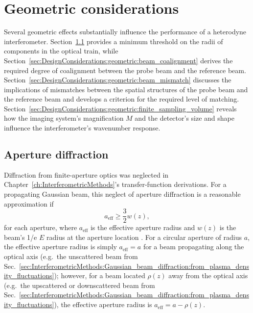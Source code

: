 \section{Geometric considerations}
\label{sec:DesignConsiderations:geometric}
Several geometric effects substantially influence
the performance of a heterodyne interferometer.
Section~\ref{sec:DesignConsiderations:geometric:aperture_diffraction}
provides a minimum threshold on the radii of components in the optical train,
while Section~\ref{sec:DesignConsiderations:geometric:beam_coalignment}
derives the required degree of coalignment between
the probe beam and the reference beam.
Section~\ref{sec:DesignConsiderations:geometric:beam_mismatch}
discusses the implications of mismatches between
the spatial structures of the probe beam and the reference beam and
develops a criterion for the required level of matching.
Section~\ref{sec:DesignConsiderations:geometric:finite_sampling_volume}
reveals how the imaging system's magnification $M$ and
the detector's size and shape
influence the interferometer's wavenumber response.


\subsection{Aperture diffraction}
\label{sec:DesignConsiderations:geometric:aperture_diffraction}
Diffraction from finite-aperture optics was neglected in
Chapter~\ref{ch:InterferometricMethods}'s
transfer-function derivations.
For a propagating Gaussian beam,
this neglect of aperture diffraction is a reasonable approximation if
\begin{equation}
  a_{\text{eff}} \geq \frac{3}{2} w(z),
  \label{eq:DesignConsiderations:aperture_radius_for_minimal_diffraction}
\end{equation}
for each aperture, where
$a_{\text{eff}}$ is the effective aperture radius and
$w(z)$ is the beam's 1/e $E$ radius at the aperture location
\cite{campbell_josa69, rost_diffraction_pc14}.
For a circular aperture of radius $a$,
the effective aperture radius is simply $a_{\text{eff}} = a$
for a beam propagating along the optical axis
(e.g.\ the unscattered beam from
Sec.~\ref{sec:InterferometricMethods:Gaussian_beam_diffraction:from_plasma_density_fluctuations});
however, for a beam located $\rho(z)$ away from the optical axis
(e.g.\ the upscattered or downscattered beam from
Sec.~\ref{sec:InterferometricMethods:Gaussian_beam_diffraction:from_plasma_density_fluctuations}),
the effective aperture radius is $a_{\text{eff}} = a - \rho(z)$.


